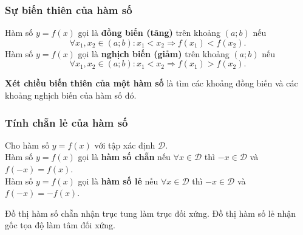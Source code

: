 \subsubsection{Sự biến thiên của hàm số}

\begin{dn}
	Hàm số $y=f(x)$ gọi là \textbf{đồng biến (tăng)} trên khoảng $(a;b)$ nếu 
	$$\forall x_1, x_2\in (a;b): x_1 < x_2 \Rightarrow f(x_1) < f(x_2).$$
	Hàm số $y=f(x)$ gọi là \textbf{nghịch biến (giảm)} trên khoảng $(a;b)$ nếu 
	$$\forall x_1, x_2\in (a;b): x_1 < x_2 \Rightarrow f(x_1) > f(x_2).$$
\end{dn}

\begin{note}
	\textbf{Xét chiều biến thiên của một hàm số} là tìm các khoảng đồng biến và các khoảng nghịch biến của hàm số đó.
\end{note} 

\subsubsection{Tính chẵn lẻ của hàm số}

\begin{dn}
	Cho hàm số $y=f(x)$ với tập xác định $\mathcal{D}$. \\
	Hàm số $y=f(x)$ gọi là \textbf{hàm số chẵn} nếu 
	$\forall x \in \mathcal{D}$ thì $-x\in \mathcal{D}$ và $f(-x)=f(x)$.\\
	Hàm số $y=f(x)$ gọi là \textbf{hàm số lẻ} nếu $\forall x \in \mathcal{D}$ thì $-x\in \mathcal{D}$ và $f(-x)=-f(x)$.
\end{dn}

\begin{note}
	Đồ thị hàm số chẵn nhận trục tung làm trục đối xứng. Đồ thị hàm số lẻ nhận gốc tọa độ làm tâm đối xứng.
\end{note}

